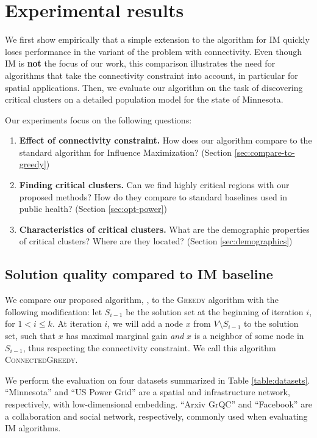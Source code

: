 \section{Experimental results}
\label{sec:experiments-cs}
We first show empirically that a simple extension to the algorithm for IM quickly loses performance in the variant of the problem with connectivity. Even though IM is \textbf{not} the focus of our work, this comparison illustrates the need for algorithms that take the connectivity constraint into account, in particular for spatial applications. Then, we evaluate our algorithm on the task of discovering critical clusters on a detailed population model for the state of Minnesota.

Our experiments focus on the following questions:
\begin{enumerate}
\item \textbf{Effect of connectivity constraint.} How does our algorithm compare to the standard algorithm for Influence Maximization? (Section \ref{sec:compare-to-greedy})
\item \textbf{Finding critical clusters.} Can we find highly critical regions with our proposed methods? How do they compare to standard baselines used in public health? (Section \ref{sec:opt-power})
\item \textbf{Characteristics of critical clusters.} What are the demographic properties of critical clusters? Where are they located? (Section \ref{sec:demographics})
\end{enumerate}

\subsection{Solution quality compared to IM baseline}
We compare our proposed algorithm, \algomaxcrit{}, to the \textsc{Greedy} algorithm with the following modification: let $S_{i-1}$ be the solution set at the beginning of iteration $i$, for $1 < i \leq k$. At iteration $i$, we will add a node $x$ from $V\setminus S_{i-1}$ to the solution set, such that $x$ has maximal marginal gain \emph{and} $x$ is a neighbor of some node in $S_{i-1}$, thus respecting the connectivity constraint. We call this algorithm \textsc{ConnectedGreedy}.

We perform the evaluation on four datasets summarized in Table \ref{table:datasets}. ``Minnesota'' and ``US Power Grid'' are a spatial and infrastructure network, respectively, with low-dimensional embedding. ``Arxiv GrQC'' and ``Facebook'' are a collaboration and social network, respectively, commonly used when evaluating IM algorithms.

